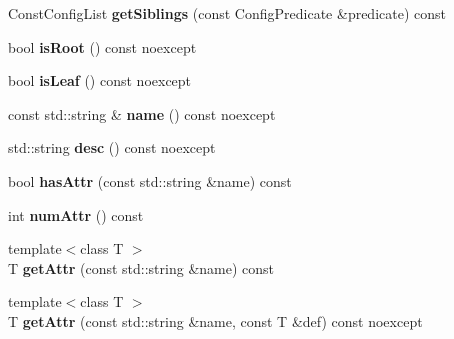 \begin{DoxyCompactItemize}
\item 
\hypertarget{classtheoria_1_1config_1_1Config_af0c8d99efb84a611e0ec7cb95350796e}{Const\+Config\+List {\bfseries get\+Siblings} (const Config\+Predicate \&predicate) const }\label{classtheoria_1_1config_1_1Config_af0c8d99efb84a611e0ec7cb95350796e}

\item 
\hypertarget{classtheoria_1_1config_1_1Config_ad50b474daddfbec84d7e610f7687fb04}{bool {\bfseries is\+Root} () const noexcept}\label{classtheoria_1_1config_1_1Config_ad50b474daddfbec84d7e610f7687fb04}

\item 
\hypertarget{classtheoria_1_1config_1_1Config_ad5c77fb1f86a7df2dce21972f921da33}{bool {\bfseries is\+Leaf} () const noexcept}\label{classtheoria_1_1config_1_1Config_ad5c77fb1f86a7df2dce21972f921da33}

\item 
\hypertarget{classtheoria_1_1config_1_1Config_af4929f1c9b86576fdc439051a10f89cd}{const std\+::string \& {\bfseries name} () const noexcept}\label{classtheoria_1_1config_1_1Config_af4929f1c9b86576fdc439051a10f89cd}

\item 
\hypertarget{classtheoria_1_1config_1_1Config_a4d6b2e26d1139819769eaf6bb959b034}{std\+::string {\bfseries desc} () const noexcept}\label{classtheoria_1_1config_1_1Config_a4d6b2e26d1139819769eaf6bb959b034}

\item 
\hypertarget{classtheoria_1_1config_1_1Config_a5c507593cfe95c57f3f37a45d07ecedd}{bool {\bfseries has\+Attr} (const std\+::string \&name) const }\label{classtheoria_1_1config_1_1Config_a5c507593cfe95c57f3f37a45d07ecedd}

\item 
\hypertarget{classtheoria_1_1config_1_1Config_ab87a7192f2b8abeaaf452e31a6ce767d}{int {\bfseries num\+Attr} () const }\label{classtheoria_1_1config_1_1Config_ab87a7192f2b8abeaaf452e31a6ce767d}

\item 
\hypertarget{classtheoria_1_1config_1_1Config_a120102b4654bbe5ff2722ed6e1292737}{{\footnotesize template$<$class T $>$ }\\T {\bfseries get\+Attr} (const std\+::string \&name) const }\label{classtheoria_1_1config_1_1Config_a120102b4654bbe5ff2722ed6e1292737}

\item 
\hypertarget{classtheoria_1_1config_1_1Config_ad05bba9dcd7dc78b999f2825fd99f8e0}{{\footnotesize template$<$class T $>$ }\\T {\bfseries get\+Attr} (const std\+::string \&name, const T \&def) const noexcept}\label{classtheoria_1_1config_1_1Config_ad05bba9dcd7dc78b999f2825fd99f8e0}


\end{DoxyCompactItemize}

